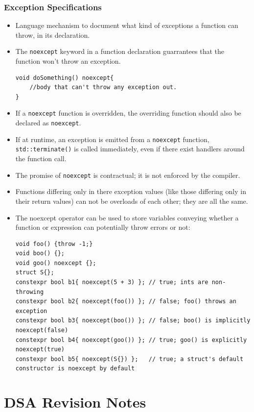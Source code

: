 \documentclass{report}
\begin{document}
\subsection{Exception Specifications}
\begin{itemize}
\item Language mechanism to document what kind of exceptions a function can throw, in its declaration.
\item The \texttt{noexcept} keyword in a function declaration guarrantees that the function won't throw an exception.
\begin{lstlisting}
void doSomething() noexcept{
    //body that can't throw any exception out.   
}
\end{lstlisting}
\item If a \texttt{noexcept} function is overridden,
the overriding function should also be declared as \texttt{noexcept}.
\item If at runtime, an exception is emitted from a \texttt{noexcept} function,
\texttt{std::terminate()} is called immediately, even if there exist handlers around
the function call.
\item The promise of \texttt{noexcept} is contractual; it is not enforced by the compiler.
\item Functions differing only in there exception values (like those differing only in their 
return values) can not be overloads of each other; they are all the same.
\item The noexcept operator can be used to store variables conveying whether a function or
expression can potentially throw errors or not:
\begin{lstlisting}
void foo() {throw -1;}
void boo() {};
void goo() noexcept {};
struct S{};
constexpr bool b1{ noexcept(5 + 3) }; // true; ints are non-throwing
constexpr bool b2{ noexcept(foo()) }; // false; foo() throws an exception
constexpr bool b3{ noexcept(boo()) }; // false; boo() is implicitly noexcept(false)
constexpr bool b4{ noexcept(goo()) }; // true; goo() is explicitly noexcept(true)
constexpr bool b5{ noexcept(S{}) };   // true; a struct's default constructor is noexcept by default
\end{lstlisting}
\end{itemize}

\chapter{DSA Revision Notes}
\end{document}
